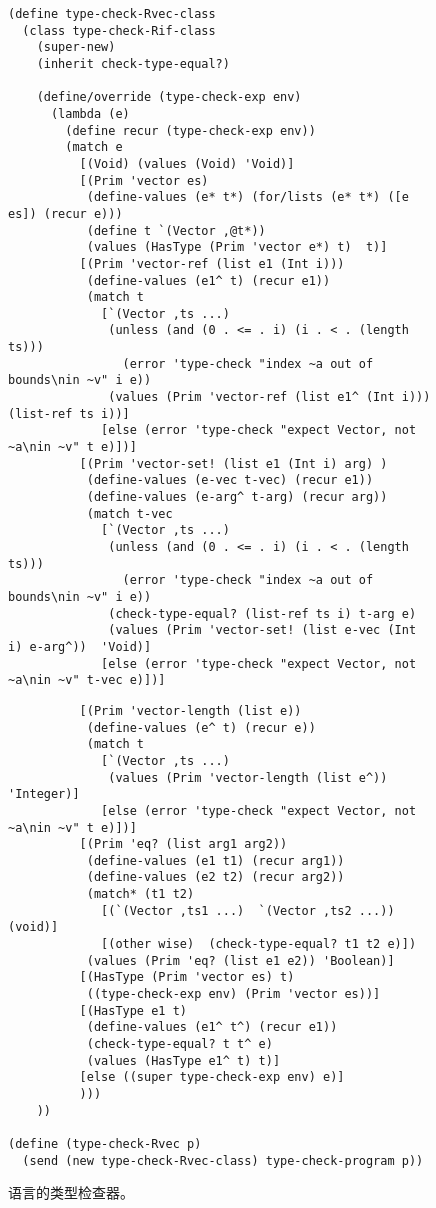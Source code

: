 \documentclass[11pt]{book}
\begin{document}
\begin{figure}[tp]
\begin{lstlisting}
(define type-check-Rvec-class
  (class type-check-Rif-class
    (super-new)
    (inherit check-type-equal?)

    (define/override (type-check-exp env)
      (lambda (e)
        (define recur (type-check-exp env))
        (match e
          [(Void) (values (Void) 'Void)]
          [(Prim 'vector es)
           (define-values (e* t*) (for/lists (e* t*) ([e es]) (recur e)))
           (define t `(Vector ,@t*))
           (values (HasType (Prim 'vector e*) t)  t)]
          [(Prim 'vector-ref (list e1 (Int i)))
           (define-values (e1^ t) (recur e1))
           (match t
             [`(Vector ,ts ...)
              (unless (and (0 . <= . i) (i . < . (length ts)))
                (error 'type-check "index ~a out of bounds\nin ~v" i e))
              (values (Prim 'vector-ref (list e1^ (Int i)))  (list-ref ts i))]
             [else (error 'type-check "expect Vector, not ~a\nin ~v" t e)])]
          [(Prim 'vector-set! (list e1 (Int i) arg) )
           (define-values (e-vec t-vec) (recur e1))
           (define-values (e-arg^ t-arg) (recur arg))
           (match t-vec
             [`(Vector ,ts ...)
              (unless (and (0 . <= . i) (i . < . (length ts)))
                (error 'type-check "index ~a out of bounds\nin ~v" i e))
              (check-type-equal? (list-ref ts i) t-arg e)
              (values (Prim 'vector-set! (list e-vec (Int i) e-arg^))  'Void)]
             [else (error 'type-check "expect Vector, not ~a\nin ~v" t-vec e)])]
\end{lstlisting}
\end{figure} 
\begin{figure}[tp]
\begin{lstlisting}               
          [(Prim 'vector-length (list e))
           (define-values (e^ t) (recur e))
           (match t
             [`(Vector ,ts ...)
              (values (Prim 'vector-length (list e^))  'Integer)]
             [else (error 'type-check "expect Vector, not ~a\nin ~v" t e)])]
          [(Prim 'eq? (list arg1 arg2))
           (define-values (e1 t1) (recur arg1))
           (define-values (e2 t2) (recur arg2))
           (match* (t1 t2)
             [(`(Vector ,ts1 ...)  `(Vector ,ts2 ...))  (void)]
             [(other wise)  (check-type-equal? t1 t2 e)])
           (values (Prim 'eq? (list e1 e2)) 'Boolean)]
          [(HasType (Prim 'vector es) t)
           ((type-check-exp env) (Prim 'vector es))]
          [(HasType e1 t)
           (define-values (e1^ t^) (recur e1))
           (check-type-equal? t t^ e)
           (values (HasType e1^ t) t)]
          [else ((super type-check-exp env) e)]
          )))
    ))

(define (type-check-Rvec p)
  (send (new type-check-Rvec-class) type-check-program p))
\end{lstlisting}
\caption{ \LangVec{} 语言的类型检查器。}
\label{fig:type-check-Rvec}
\end{figure}
\end{document}
